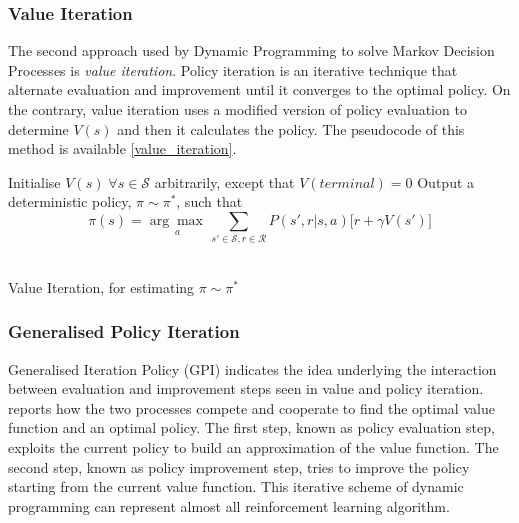 \subsubsection{Value Iteration}

The second approach used by Dynamic Programming to solve Markov Decision Processes is \textit{value iteration}.
Policy iteration is an iterative technique that alternate evaluation and improvement until it converges to the optimal policy.
On the contrary, value iteration uses a modified version of policy evaluation to determine $V(s)$ and then it calculates the policy.
The pseudocode of this method is available \vref{value_iteration}.

\begin{algorithm}[!htp]
	\SetAlgoLined
	\DontPrintSemicolon
	\LinesNumbered
	Initialise $V(s) \; \forall s \in \mathcal{S}$ arbitrarily, except that $V(terminal) = 0$\;
		Output a deterministic policy, $\pi \sim \pi^*$, such that \[
		\pi(s) = \underset{a}{\arg\max\,} \sum_{s' \in \mathcal{S}, r \in \mathcal{R}} P(s', r|s,a) \big[r+\gamma V(s')\big]\]\\
	\caption{Value Iteration, for estimating $\pi \sim \pi^*$}
	\label{value_iteration}
\end{algorithm}

\subsubsection{Generalised Policy Iteration}

Generalised Iteration Policy (GPI) indicates the idea underlying the interaction between evaluation and improvement steps seen in value and policy iteration.
 reports how the two processes compete and cooperate to find the optimal value function and an optimal policy. The first step, known as policy evaluation step, exploits the current policy to build an approximation of the value function. The second step, known as policy improvement step, tries to improve the policy starting from the current value function.
This iterative scheme of dynamic programming can represent almost all reinforcement learning algorithm.


